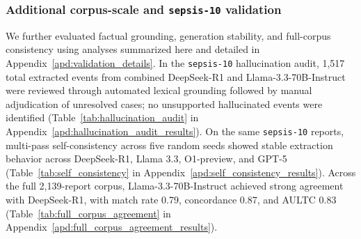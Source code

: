 \documentclass[pmlr,twocolumn,10pt]{jmlr} %
\begin{document}




\subsubsection{Additional corpus-scale and \texttt{sepsis-10} validation}
\label{sec:additional_validation_summary}

We further evaluated factual grounding, generation stability, and full-corpus consistency using analyses summarized here and detailed in Appendix~\ref{apd:validation_details}.
In the \texttt{sepsis-10} hallucination audit, 1,517 total extracted events from combined DeepSeek-R1 and Llama-3.3-70B-Instruct were reviewed through automated lexical grounding followed by manual adjudication of unresolved cases; no unsupported hallucinated events were identified (Table~\ref{tab:hallucination_audit} in Appendix~\ref{apd:hallucination_audit_results}).
On the same \texttt{sepsis-10} reports, multi-pass self-consistency across five random seeds showed stable extraction behavior across DeepSeek-R1, Llama 3.3, O1-preview, and GPT-5 (Table~\ref{tab:self_consistency} in Appendix~\ref{apd:self_consistency_results}).
Across the full 2,139-report corpus, Llama-3.3-70B-Instruct achieved strong agreement with DeepSeek-R1, with match rate 0.79, concordance 0.87, and AULTC 0.83 (Table~\ref{tab:full_corpus_agreement} in Appendix~\ref{apd:full_corpus_agreement_results}).
\end{document}
